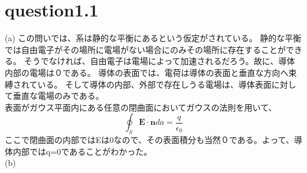\documentclass{article}
\begin{document}
\section  {question1.1}
(a) この問いでは、系は静的な平衡にあるという仮定がされている。
静的な平衡では自由電子がその場所に電場がない場合にのみその場所に存在することができる。
そうでなければ、自由電子は電場によって加速されるだろう。故に、導体内部の電場は０である。
導体の表面では、電荷は導体の表面と垂直な方向へ束縛されている。
そして導体の内部、外部で存在しうる電場は、導体表面に対して垂直な電場のみである。
\\
表面がガウス平面内にある任意の閉曲面においてガウスの法則を用いて、
\[
  \oint_S \mathbf{E} \cdot \mathbf{n} da = \frac{q}{\epsilon_0}
\]
ここで閉曲面の内部ではEは0なので、その表面積分も当然０である。よって、導体内部ではq=0であることがわかった。
\\
(b) 
\end{document}
